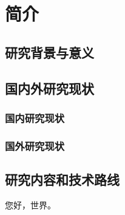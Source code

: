 \chapter{简介}

\section{研究背景与意义}


\section{国内外研究现状}

\subsection{国内研究现状}

\subsection{国外研究现状}

\section{研究内容和技术路线}

您好，世界。
